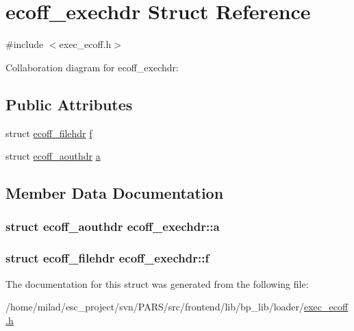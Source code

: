 \hypertarget{structecoff__exechdr}{
\section{ecoff\_\-exechdr Struct Reference}
\label{structecoff__exechdr}
}


{\ttfamily \#include $<$exec\_\-ecoff.h$>$}



Collaboration diagram for ecoff\_\-exechdr:
\subsection*{Public Attributes}
\begin{DoxyCompactItemize}
\item 
struct \hyperlink{structecoff__filehdr}{ecoff\_\-filehdr} \hyperlink{structecoff__exechdr_aac8cdc399b8bab77efd14042f8308942}{f}
\item 
struct \hyperlink{structecoff__aouthdr}{ecoff\_\-aouthdr} \hyperlink{structecoff__exechdr_accf4b0339bf49c73a980523dcb42b2d7}{a}
\end{DoxyCompactItemize}


\subsection{Member Data Documentation}
\hypertarget{structecoff__exechdr_accf4b0339bf49c73a980523dcb42b2d7}{
\subsubsection[{a}]{\setlength{\rightskip}{0pt plus 5cm}struct {\bf ecoff\_\-aouthdr} {\bf ecoff\_\-exechdr::a}}}
\label{structecoff__exechdr_accf4b0339bf49c73a980523dcb42b2d7}
\hypertarget{structecoff__exechdr_aac8cdc399b8bab77efd14042f8308942}{
\subsubsection[{f}]{\setlength{\rightskip}{0pt plus 5cm}struct {\bf ecoff\_\-filehdr} {\bf ecoff\_\-exechdr::f}}}
\label{structecoff__exechdr_aac8cdc399b8bab77efd14042f8308942}


The documentation for this struct was generated from the following file:\begin{DoxyCompactItemize}
\item 
/home/milad/esc\_\-project/svn/PARS/src/frontend/lib/bp\_\-lib/loader/\hyperlink{exec__ecoff_8h}{exec\_\-ecoff.h}\end{DoxyCompactItemize}
